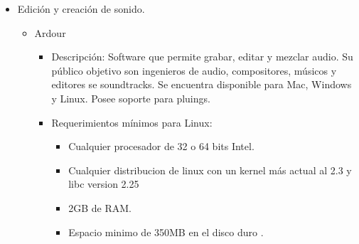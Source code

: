 \begin{itemize}
\begin{itemize}
\begin{itemize}
					\end{itemize}
			\end{itemize}
		\item Edición y creación de sonido.
			\begin{itemize}
				\item Ardour
					\begin{itemize}
						\item Descripción: Software que permite grabar, editar y mezclar 
						audio. Su público objetivo son ingenieros de audio, 
						compositores, músicos y editores se soundtracks. Se encuentra 
						disponible para Mac, Windows y Linux. Posee soporte para 
						pluings.
						\item Requerimientos mínimos para Linux:
						\begin{itemize}
							\item Cualquier procesador de 32 o 64 bits Intel.
							\item Cualquier distribucion de linux con un kernel más 
							actual al 2.3 y libc version 2.25 
							\item 2GB de RAM.
							\item Espacio minimo de 350MB en el disco duro
							\cite{Ref:Ardour}.

						\end{itemize}
					\end{itemize}
			\end{itemize}
\end{itemize}